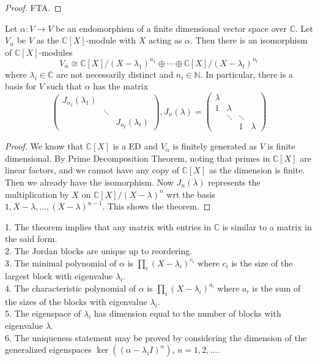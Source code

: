 \begin{proof}
    FTA.
\end{proof}
\begin{theorem}
    Let $\alpha:V\to V$ be an endomorphism of a finite dimensional vector space over $\mathbb C$.
    Let $V_\alpha$ be $V$ as the $\mathbb C[X]$-module with $X$ acting as $\alpha$.
    Then there is an isomorphism of $\mathbb C[X]$-modules
    $$V_\alpha\cong\mathbb C[X]/(X-\lambda_1)^{n_1}\oplus\cdots\oplus\mathbb C[X]/(X-\lambda_t)^{n_t}$$
    where $\lambda_i\in\mathbb C$ are not necessarily distinct and $n_i\in\mathbb N$.
    In particular, there is a basis for $V$ such that $\alpha$ has the matrix
    $$\begin{pmatrix}
        J_{n_1}(\lambda_1)&&\\
        &\ddots&\\
        &&J_{n_t}(\lambda_t)
    \end{pmatrix},J_n(\lambda)=\begin{pmatrix}
        \lambda&&&\\
        1&\lambda&&\\
        &\ddots&\ddots&\\
        &&1&\lambda
    \end{pmatrix}$$
\end{theorem}
\begin{proof}
    We know that $\mathbb C[X]$ is a ED and $V_\alpha$ is finitely generated as $V$ is finite dimensional.
    By Prime Decomposition Theorem, noting that primes in $\mathbb C[X]$ are linear factors, and we cannot have any copy of $\mathbb C[X]$ as the dimension is finite.
    Then we already have the isomorphism.
    Now $J_n(\lambda)$ represents the multiplication by $X$ on $\mathbb C[X]/(X-\lambda)^n$ wrt the basis $1,X-\lambda,\ldots,(X-\lambda)^{n-1}$.
    This shows the theorem.
\end{proof}
\begin{remark}
    1. The theorem implies that any matrix with entries in $\mathbb C$ is similar to a matrix in the said form.\\
    2. The Jordan blocks are unique up to reordering.\\
    3. The minimal polynomial of $\alpha$ is $\prod_i(X-\lambda_i)^{c_i}$ where $c_i$ is the size of the largest block with eigenvalue $\lambda_i$.\\
    4. The characteristic polynomial of $\alpha$ is $\prod_i(X-\lambda_i)^{a_i}$ where $a_i$ is the sum of the sizes of the blocks with eigenvalue $\lambda_i$.\\
    5. The eigenspace of $\lambda_i$ has dimension equal to the number of blocks with eigenvalue $\lambda$.\\
    6. The uniqueness statement may be proved by considering the dimension of the generalized eigenspaces $\ker((\alpha-\lambda_iI)^n)$, $n=1,2,\ldots$.
\end{remark}
